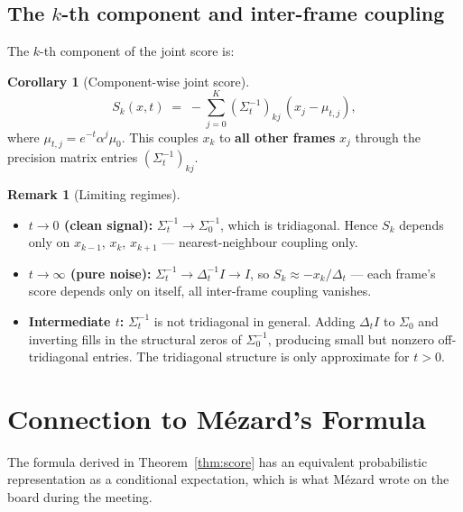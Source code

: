 \documentclass[12pt, a4paper]{article}
\def\bx{x}%
\def\bm#1{#1}%
\theoremstyle{definition}
\newtheorem{corollary}{Corollary}[section]
\newtheorem{remark}{Remark}[section]
\newcommand{\bx}{\bm{x}}
\newcommand{\dt}{\Delta_t}
\begin{document}
\subsection{The \texorpdfstring{$k$}{k}-th component and inter-frame coupling}

The $k$-th component of the joint score is:

\begin{corollary}[Component-wise joint score]
\[
  S_k(\bx, t)
  \;=\;
  -\sum_{j=0}^{K}(\Sigma_t^{-1})_{kj}\,(x_j - \mu_{t,j}),
\]
where $\mu_{t,j} = e^{-t}\alpha^j\mu_0$. This couples $x_k$ to
\textbf{all other frames} $x_j$ through the precision matrix entries
$(\Sigma_t^{-1})_{kj}$.
\end{corollary}

\begin{remark}[Limiting regimes]
\hfill
\begin{itemize}
  \item \textbf{$t \to 0$ (clean signal):} $\Sigma_t^{-1} \to
    \Sigma_0^{-1}$, which is tridiagonal. Hence
    $S_k$ depends only on $x_{k-1}$, $x_k$, $x_{k+1}$ —
    nearest-neighbour coupling only.

  \item \textbf{$t \to \infty$ (pure noise):} $\Sigma_t^{-1}
    \to \dt^{-1}I \to I$, so $S_k \approx -x_k/\dt$ — each
    frame's score depends only on itself, all inter-frame coupling
    vanishes.

  \item \textbf{Intermediate $t$:} $\Sigma_t^{-1}$ is not tridiagonal
    in general. Adding $\dt I$ to $\Sigma_0$ and inverting fills in
    the structural zeros of $\Sigma_0^{-1}$, producing small but nonzero
    off-tridiagonal entries. The tridiagonal structure is only approximate
    for $t > 0$.
\end{itemize}
\end{remark}

\section{Connection to M\'ezard's Formula}

The formula derived in Theorem~\ref{thm:score} has an equivalent
probabilistic representation as a conditional expectation, which is what
M\'ezard wrote on the board during the meeting.
\end{document}
